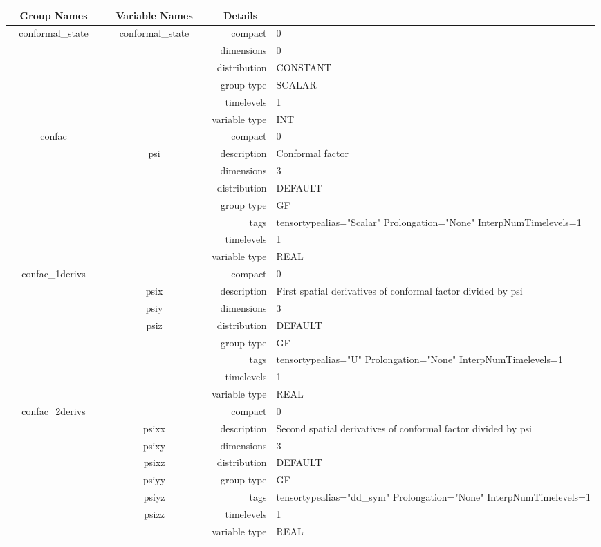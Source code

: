 \documentclass{article}
\begin{document}
\begin{tabular*}{150mm}{|c|c@{\extracolsep{\fill}}|rl|} \hline 
~ {\bf Group Names} ~ & ~ {\bf Variable Names} ~  &{\bf Details} ~ & ~\\ 
\hline 
conformal\_state & conformal\_state & compact & 0 \\ 
 &  & dimensions & 0 \\ 
 &  & distribution & CONSTANT \\ 
 &  & group type & SCALAR \\ 
 &  & timelevels & 1 \\ 
 &  & variable type & INT \\ 
\hline 
confac &  & compact & 0 \\ 
 & psi & description & Conformal factor \\ 
 &  & dimensions & 3 \\ 
 &  & distribution & DEFAULT \\ 
 &  & group type & GF \\ 
 &  & tags & tensortypealias="Scalar" Prolongation="None" InterpNumTimelevels=1 \\ 
 &  & timelevels & 1 \\ 
 &  & variable type & REAL \\ 
\hline 
confac\_1derivs &  & compact & 0 \\ 
 & psix & description & First spatial derivatives of conformal factor divided by psi \\ 
 & psiy & dimensions & 3 \\ 
 & psiz & distribution & DEFAULT \\ 
 &  & group type & GF \\ 
 &  & tags & tensortypealias="U" Prolongation="None" InterpNumTimelevels=1 \\ 
 &  & timelevels & 1 \\ 
 &  & variable type & REAL \\ 
\hline 
confac\_2derivs &  & compact & 0 \\ 
 & psixx & description & Second spatial derivatives of conformal factor divided by psi \\ 
 & psixy & dimensions & 3 \\ 
 & psixz & distribution & DEFAULT \\ 
 & psiyy & group type & GF \\ 
 & psiyz & tags & tensortypealias="dd\_sym" Prolongation="None" InterpNumTimelevels=1 \\ 
 & psizz & timelevels & 1 \\ 
 &  & variable type & REAL \\ 
\hline 
\end{tabular*} 
\end{document}
